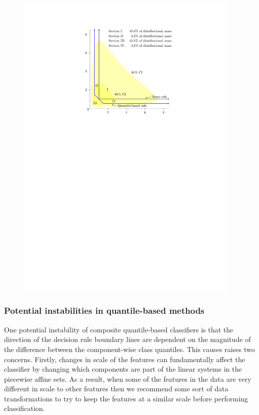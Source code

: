 \begin{figure}[ht]
\begin{minipage}[t]{0.49\linewidth}
    \includegraphics[width=0.95\textwidth]{exp_gauss_rule}
  \end{minipage}
\end{figure}



\subsubsection{Potential instabilities in quantile-based methods}
\label{sec:instabilities}

One potential instability of composite quantile-based classifiers is that the
direction of the decision rule boundary lines are dependent on the magnitude of
the difference between the component-wise class quantiles.  This causes raises
two concerns.  Firstly, changes in scale of the features can fundamentally
affect the classifier by changing which components are part of the linear
systems in the piecewise affine sets.  As a result, when some of the features in
the data are very different in scale to other features then we recommend some
sort of data transformations to try to keep the features at a similar scale
before performing classification.

